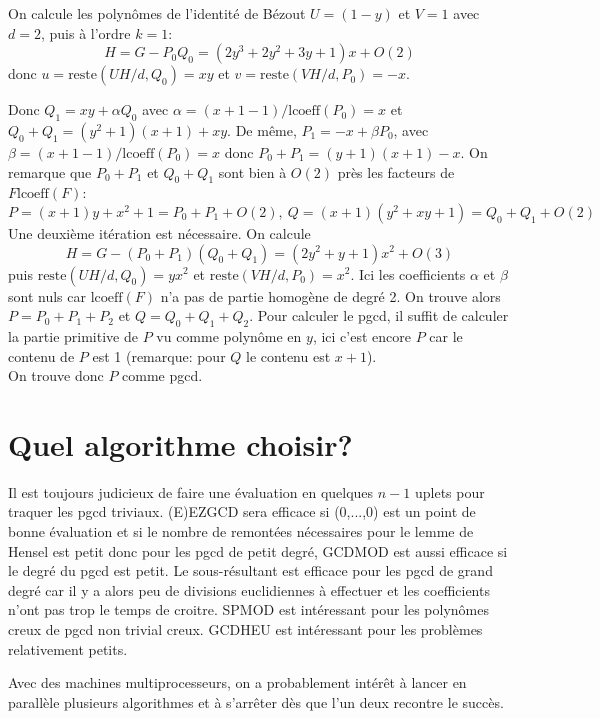 \documentclass[a4paper,11pt]{book}
\begin{document}
\begin{giacjshere}
On calcule les polynômes de l'identité de Bézout $U = ( 1 - y )$ et $V = 1$
avec $d = 2$, puis à l'ordre $k = 1$:
\[ H = G - P_0 Q_0 = ( 2 y^3 + 2 y^2 + 3 y + 1 ) x + O ( 2 ) \]
donc $u = \mbox{reste} ( U H / d, Q_0 ) = x y$ et $v = \mbox{reste} ( V H / d,
P_0 ) = - x$.

Donc $Q_1 = x y + \alpha Q_0$ avec $\alpha = ( x + 1 - 1 ) / \mbox{lcoeff} (
P_0 ) = x$ et $Q_0 + Q_1 = ( y^2 + 1 ) ( x + 1 ) + x y$. De
même, $P_1 = - x + \beta P_0$, avec $\beta = ( x + 1 - 1 ) / \mbox{lcoeff} (
P_0 ) = x$ donc $P_0 + P_1 = ( y + 1 ) ( x + 1 ) - x$. On remarque que $P_0 +
P_1$ et $Q_0 + Q_1$ sont bien à $O ( 2 )$ près les facteurs de $F
\mbox{lcoeff} ( F )$:
\[ P = ( x + 1 ) y + x^2 + 1 = P_0 + P_1 + O ( 2 ), \ Q = ( x +
   1 ) ( y^2 + x y + 1 ) = Q_0 + Q_1 + O ( 2 ) \]
Une deuxième itération est nécessaire. On calcule
\[ H = G - ( P_0 + P_1 ) ( Q_0 + Q_1 ) = ( 2 y^2 + y + 1 ) x^2 + O ( 3
   ) \]
puis $\mbox{reste} ( U H / d, Q_0 ) = y x^2$ et $\mbox{reste} ( V H / d, P_0 )
= x^2$. Ici les coefficients $\alpha$ et $\beta$ sont nuls car $\mbox{lcoeff}
( F )$ n'a pas de partie homogène de degré 2. On trouve alors $P = P_0 + P_1 +
P_2$ et $Q = Q_0 + Q_1 + Q_2$. Pour calculer le pgcd, il suffit de calculer la
partie primitive de $P$ vu comme polynôme en $y$, ici c'est encore $P$ car le
contenu de $P$ est 1 (remarque: pour $Q$ le contenu est $x + 1$).\\
On trouve donc $P$ comme pgcd.

\section{Quel algorithme choisir?}

Il est toujours judicieux de faire une évaluation en quelques $n - 1$ uplets
pour traquer les pgcd triviaux. (E)EZGCD sera efficace si (0,...,0) est un
point de bonne évaluation et si le nombre de remontées nécessaires pour le
lemme de Hensel est petit donc pour les pgcd de petit degré, GCDMOD est aussi
efficace si le degré du pgcd est petit. Le sous-résultant est efficace pour
les pgcd de grand degré car il y a alors peu de divisions euclidiennes à
effectuer et les coefficients n'ont pas trop le temps de croitre. SPMOD est
intéressant pour les polynômes creux de pgcd non trivial creux. GCDHEU est
intéressant pour les problèmes relativement petits.

Avec des machines multiprocesseurs, on a probablement intérêt à lancer en
parallèle plusieurs algorithmes et à s'arrêter dès que l'un deux recontre le
succès.


\end{giacjshere}
\end{document}
